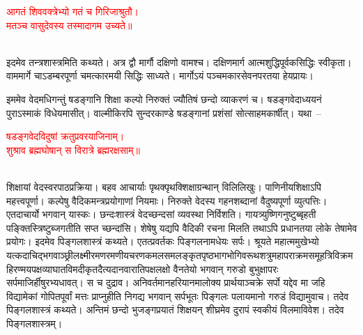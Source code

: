 \centering\textcolor{red}{आगतं शिववक्त्रेभ्यो गतं च गिरिजाश्रुतौ।\nopagebreak\\
मतञ्च वासुदेवस्य तस्मादागम उच्यते॥}\nopagebreak\\
\\
\begin{sloppypar}\justifying इदमेव तन्त्र\-शास्त्रमिति कथ्यते। अत्र द्वौ मार्गौ दक्षिणो वामश्च। दक्षिण\-मार्ग आत्म\-शुद्धि\-पूर्वक\-सिद्धिः स्वीकृता। वाममार्गे चाऽडम्बर\-पूर्णा चमत्कार\-मयी सिद्धिः साध्यते। मार्गोऽयं पञ्च\-मकार\-सेवन\-परतया हेयप्रायः। \end{sloppypar}
\begin{sloppypar}\justifying\noindent\hspace{10mm} इममेव वेदमधिगन्तुं षडङ्गानि शिक्षा कल्पो निरुक्तं ज्यौतिषं छन्दो व्याकरणं च। षडङ्ग\-वेदाध्ययनं पुराऽस्माकं विधेयमासीत्। वाल्मीकिरपि सुन्दरकाण्डे षडङ्गानां प्रशंसां सोत्साहमकार्षीत्। यथा~–\end{sloppypar}
\centering\textcolor{red}{षडङ्गवेदविदुषां क्रतुप्रवरयाजिनाम्।\nopagebreak\\
शुश्राव ब्रह्मघोषान् स विरात्रे ब्रह्मरक्षसाम्॥}\nopagebreak\\
\\
\begin{sloppypar}\justifying\noindent\hspace{10mm} शिक्षायां वेद\-स्वर\-पाठ\-प्रक्रिया। बहव आचार्याः पृथक्पृथक्शिक्षा\-ग्रन्थान् विलिलिखुः। पाणिनीय\-शिक्षाऽपि महत्त्वपूर्णा। कल्पेषु वैदिक\-मन्त्र\-प्रयोगाणां नियमाः। निरुक्ते वेदस्य गहन\-शब्दानां वैदुष्य\-पूर्णा व्युत्पत्तिः। एतदाचार्यो भगवान् यास्कः। छन्दः\-शास्त्रं वेद\-च्छन्दसां व्यवस्था निर्विशति।
गायत्र्युष्णिगनुष्टुब्बृहती पङ्क्तिस्त्रिष्टुब्जगतीति सप्त च्छन्दांसि। शेषेषु यद्यपि वैदिकी रचना मिलति तथाऽपि प्रधानतया लोके तेषामेव प्रयोगः। इदमेव पिङ्गल\-शास्त्रं कथ्यते। एतत्प्रवर्तकः पिङ्गल\-नामधेयः सर्पः। श्रूयते महात्ममुखेभ्यो यत्कदाचिद्भगवाञ्छ्रीलक्ष्मी\-रमण\-रमणीय\-चरण\-कमल\-समलङ्कृत\-पृष्ठभाग\-भोगि\-वरूथ\-शत्रु\-महा\-पराक्रम\-समूह\-त्रिविक्रम\-हिरण्मय\-पक्ष\-व्याघात\-विमदीकृत\-दैत्य\-दानवाराति\-पक्ष\-लक्षो वैनतेयो भगवान् गरुडो बुभुक्षा\-परः सर्पमाजिर्हीषुरभ्यधावत्। स च दुद्राव। अनिवर्तमान\-हरियानमालोक्य प्रार्थयाञ्चक्रे सर्पो यद्देव मा जहि विद्यामेकां गोपित\-पूर्वां मत्तः प्राप्नुहीति निगद्य भगवान् सर्पभूतः पिङ्गलः पलायमानो गरुडं विद्यामुवाच। तदेव पिङ्गल\-शास्त्रं कथ्यते। अन्तिमं छन्दो भुजङ्गप्रयातं शिक्षयन् शीघ्रमेव दुरापं स्वकीयं विलमाविवेश। तदेव पिङ्गल\-शास्त्रम्। \end{sloppypar}
